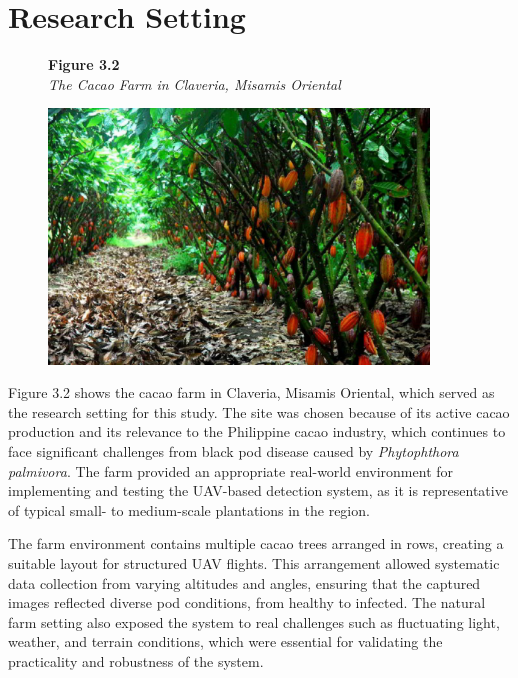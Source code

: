 	\section{Research Setting}
	
	\begin{figure}[H]
		\raggedright
		\textbf{Figure 3.2} \\ %
		\textit{The Cacao Farm in Claveria, Misamis Oriental} %
		
		\vspace{0.5em}
		\centering
		\includegraphics[width=0.9\textwidth]{figures/cacao_farm.pdf} %
		
		\vspace{0.5em}
		\raggedright
		
		\label{fig:cacao_farm}
	\end{figure}
	
	Figure 3.2 shows the cacao farm in Claveria, Misamis Oriental, which served as the research setting for this study. 
	The site was chosen because of its active cacao production and its relevance to the Philippine cacao industry, which continues to face significant challenges from black pod disease caused by \textit{Phytophthora palmivora}. 
	The farm provided an appropriate real-world environment for implementing and testing the UAV-based detection system, as it is representative of typical small- to medium-scale plantations in the region.  
	
	The farm environment contains multiple cacao trees arranged in rows, creating a suitable layout for structured UAV flights. 
	This arrangement allowed systematic data collection from varying altitudes and angles, ensuring that the captured images reflected diverse pod conditions, from healthy to infected. 
	The natural farm setting also exposed the system to real challenges such as fluctuating light, weather, and terrain conditions, which were essential for validating the practicality and robustness of the system.  
	
